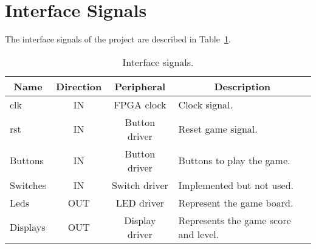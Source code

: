 \section{Interface Signals}
\label{sec:is}

The interface signals of the project are described in Table~\ref{tab:is}.

\begin{table}[h]
\centering
\begin{tabular}{|l|c|c|l|}
\hline
\multicolumn{1}{|c|}{\bf Name} & {\bf Direction} & {\bf Peripheral} & \multicolumn{1}{c|}{\bf Description} \\ 
\hline \hline
\multicolumn{1}{|l|}{clk}                & IN & FPGA clock & Clock signal.\\ 
\hline
\multicolumn{1}{|l|}{rst}                & IN & Button driver & Reset game signal.\\
\hline
\multicolumn{1}{|l|}{Buttons}            & IN & Button driver & Buttons to play the game.\\
\hline
\multicolumn{1}{|l|}{Switches}           & IN & Switch driver & Implemented but not used. \\
\hline
\multicolumn{1}{|l|}{Leds}               & OUT & LED driver & Represent the game board.\\
\hline
\multicolumn{1}{|l|}{Displays}            & OUT & Display driver & Represents the game score and level.\\
\hline
\end{tabular}
\caption{Interface signals.}
\label{tab:is}
\end{table}

